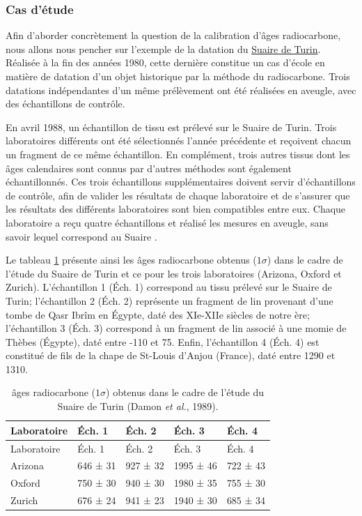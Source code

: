 \documentclass[
  french,
]{scrbook}
\begin{document}
\hypertarget{cas-duxe9tude}{%
\subsubsection{Cas d'étude}\label{cas-duxe9tude}}

Afin d'aborder concrètement la question de la calibration d'âges radiocarbone, nous allons nous pencher sur l'exemple de la datation du \href{https://fr.wikipedia.org/wiki/Suaire_de_Turin\#La_datation_par_le_carbone_14_(1988-1989)}{Suaire de Turin}. Réalisée à la fin des années 1980, cette dernière constitue un cas d'école en matière de datation d'un objet historique par la méthode du radiocarbone. Trois datations indépendantes d'un même prélèvement ont été réalisées en aveugle, avec des échantillons de contrôle.

En avril 1988, un échantillon de tissu est prélevé sur le Suaire de Turin. Trois laboratoires différents ont été sélectionnés l'année précédente et reçoivent chacun un fragment de ce même échantillon. En complément, trois autres tissus dont les âges calendaires sont connus par d'autres méthodes sont également échantillonnés. Ces trois échantillons supplémentaires doivent servir d'échantillons de contrôle, afin de valider les résultats de chaque laboratoire et de s'assurer que les résultats des différents laboratoires sont bien compatibles entre eux. Chaque laboratoire a reçu quatre échantillons et réalisé les mesures en aveugle, sans savoir lequel correspond au Suaire \autocite{damon1989}.

Le tableau \ref{tab:c14-turin} présente ainsi les âges radiocarbone obtenus (\(1\sigma\)) dans le cadre de l'étude du Suaire de Turin \autocite{damon1989} et ce pour les trois laboratoires (Arizona, Oxford et Zurich). L'échantillon 1 (Éch. 1) correspond au tissu prélevé sur le Suaire de Turin; l'échantillon 2 (Éch. 2) représente un fragment de lin provenant d'une tombe de Qasr Ibrîm en Égypte, daté des XIe-XIIe siècles de notre ère; l'échantillon 3 (Éch. 3) correspond à un fragment de lin associé à une momie de Thèbes (Égypte), daté entre -110 et 75. Enfin, l'échantillon 4 (Éch. 4) est constitué de fils de la chape de St-Louis d'Anjou (France), daté entre 1290 et 1310.

\begin{longtable}[]{@{}lllll@{}}
\caption{\label{tab:c14-turin} âges radiocarbone (\(1\sigma\)) obtenus dans le cadre de l'étude du Suaire de Turin (Damon \emph{et al.}, 1989).}\tabularnewline
\toprule
Laboratoire & Éch. 1 & Éch. 2 & Éch. 3 & Éch. 4 \\
\midrule
\endfirsthead
\toprule
Laboratoire & Éch. 1 & Éch. 2 & Éch. 3 & Éch. 4 \\
\midrule
\endhead
Arizona & 646 ± 31 & 927 ± 32 & 1995 ± 46 & 722 ± 43 \\
Oxford & 750 ± 30 & 940 ± 30 & 1980 ± 35 & 755 ± 30 \\
Zurich & 676 ± 24 & 941 ± 23 & 1940 ± 30 & 685 ± 34 \\
\bottomrule
\end{longtable}
\end{document}
